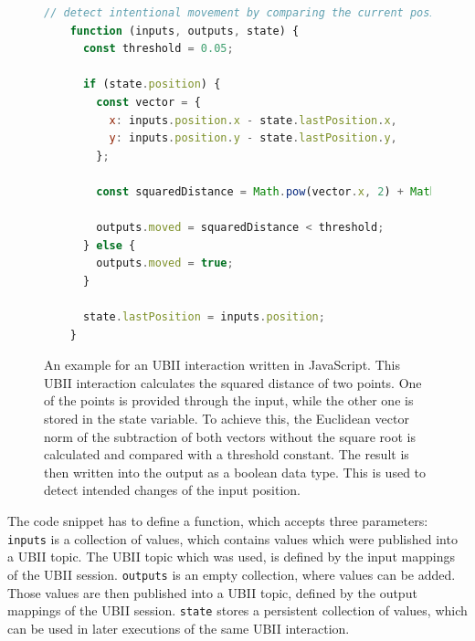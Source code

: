 \begin{figure}[H]
  \begin{lstlisting}[language=JavaScript]
    // detect intentional movement by comparing the current position with a previous one
    function (inputs, outputs, state) {
      const threshold = 0.05;

      if (state.position) {
        const vector = {
          x: inputs.position.x - state.lastPosition.x,
          y: inputs.position.y - state.lastPosition.y,
        };
  
        const squaredDistance = Math.pow(vector.x, 2) + Math.pow(vector.y, 2);
  
        outputs.moved = squaredDistance < threshold;
      } else {
        outputs.moved = true;
      }

      state.lastPosition = inputs.position;
    }
  \end{lstlisting}
  \caption[Basic UBII interaction in JavaScript]{An example for an \ac{UBII} interaction written in JavaScript. This \ac{UBII} interaction calculates the squared distance of two points. One of the points is provided through the input, while the other one is stored in the state variable. To achieve this, the Euclidean vector norm of the subtraction of both vectors without the square root is calculated and compared with a threshold constant. The result is then written into the output as a boolean data type. This is used to detect intended changes of the input position.}\label{fig:ubii-interaction-example} %
\end{figure}

The code snippet has to define a function, which accepts three parameters: 
\lstinline{inputs} is a collection of values, which contains values which were published into a \ac{UBII} topic. The \ac{UBII} topic which was used, is defined by the input mappings of the \ac{UBII} session. \lstinline{outputs} is an empty collection, where values can be added. Those values are then published into a \ac{UBII} topic, defined by the output mappings of the \ac{UBII} session. \lstinline{state} stores a persistent collection of values, which can be used in later executions of the same \ac{UBII} interaction.